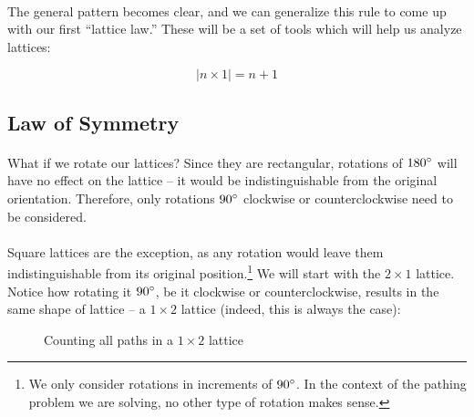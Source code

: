 \documentclass[12pt]{article}
\newcommand{\p}{\paragraph{}}
\begin{document}
			\p The general pattern becomes clear, and we can generalize this rule to come up with our first ``lattice law.'' These will be a set of tools which will help us analyze lattices:
			
			\begin{equation*}
				|n \times 1| = n + 1
			\end{equation*}
			
		\subsection{Law of Symmetry}
		
			\p What if we rotate our lattices? Since they are rectangular, rotations of $180\degree$ will have no effect on the lattice -- it would be indistinguishable from the original orientation. Therefore, only rotations $90\degree$ clockwise or counterclockwise need to be considered.
			
			\p Square lattices are the exception, as any rotation would leave them indistinguishable from its original position.\footnote{We only consider rotations in increments of $90\degree$. In the context of the pathing problem we are solving, no other type of rotation makes sense.} We will start with the $2\times1$ lattice. Notice how rotating it $90\degree$, be it clockwise or counterclockwise, results in the same shape of lattice -- a $1\times2$ lattice (indeed, this is always the case):
			
			\begin{figure}[h]
				\centering
				
				\begin{subfigure}{.3\textwidth}
					\centering
				\end{subfigure}%
				\begin{subfigure}{.3\textwidth}
					\centering
				\end{subfigure}%
				\begin{subfigure}{.3\textwidth}
					\centering
				\end{subfigure}
				
				\caption{Counting all paths in a $1\times2$ lattice}
			\end{figure}
		
\end{document}
